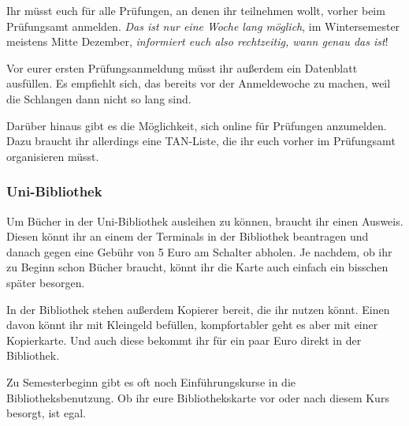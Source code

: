 \begin{multicols}{2}
	Ihr müsst euch für alle Prüfungen, an denen ihr teilnehmen wollt, vorher beim Prüfungsamt anmelden. \emph{Das ist nur eine Woche lang möglich}, im Wintersemester meistens Mitte Dezember, \emph{informiert euch also rechtzeitig, wann genau das ist}!

	Vor eurer ersten Prüfungsanmeldung müsst ihr außerdem ein Datenblatt ausfüllen. Es empfiehlt sich, das bereits vor der Anmeldewoche zu machen, weil die Schlangen dann nicht so lang sind.

	Darüber hinaus gibt es die Möglichkeit, sich online für Prüfungen anzumelden. Dazu braucht ihr allerdings eine TAN-Liste, die ihr euch vorher im Prüfungsamt organisieren müsst.

%

\subsubsection{Uni-Bibliothek}
	\label{todobib}

	Um Bücher in der Uni-Bibliothek ausleihen zu können, braucht ihr einen Ausweis. Diesen könnt ihr an einem der Terminals in der Bibliothek beantragen und danach gegen eine Gebühr von 5 Euro am Schalter abholen. Je nachdem, ob ihr zu Beginn schon Bücher braucht, könnt ihr die Karte auch einfach ein bisschen später besorgen.

	In der Bibliothek stehen außerdem Kopierer bereit, die ihr nutzen könnt. Einen davon könnt ihr mit Kleingeld befüllen, kompfortabler geht es aber mit einer Kopierkarte. Und auch diese bekommt ihr für ein paar Euro direkt in der Bibliothek.

	Zu Semesterbeginn gibt es oft noch Einführungskurse in die Bibliotheksbenutzung. Ob ihr eure Bibliothekskarte vor oder nach diesem Kurs besorgt, ist egal.
\end{multicols}
